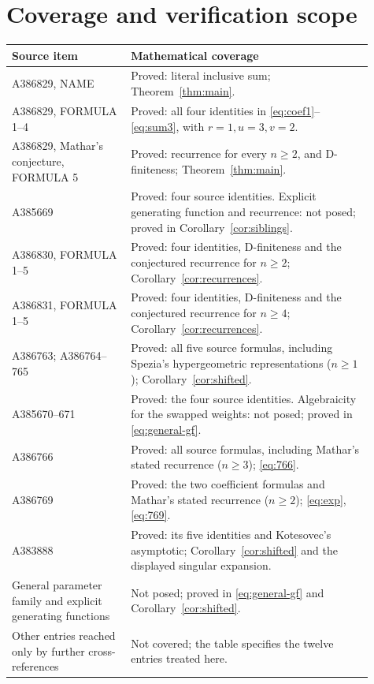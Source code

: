 \documentclass[11pt]{article}
\begin{document}
\section{Coverage and verification scope}
\begin{center}
\small
\begin{tabular}{@{}p{0.30\linewidth}p{0.61\linewidth}@{}}
\toprule
Source item & Mathematical coverage\\
\midrule
A386829, NAME & Proved: literal inclusive sum; Theorem~\ref{thm:main}.\\
A386829, FORMULA 1--4 & Proved: all four identities in
\eqref{eq:coef1}--\eqref{eq:sum3}, with $r=1,u=3,v=2$.\\
A386829, Mathar's conjecture, FORMULA 5 & Proved: recurrence for every $n\geq2$,
and D-finiteness; Theorem~\ref{thm:main}.\\
A385669 & Proved: four source identities. Explicit generating function
and recurrence: not posed; proved in Corollary~\ref{cor:siblings}.\\
A386830, FORMULA 1--5 & Proved: four identities, D-finiteness and the
conjectured recurrence for $n\geq2$; Corollary~\ref{cor:recurrences}.\\
A386831, FORMULA 1--5 & Proved: four identities, D-finiteness and the
conjectured recurrence for $n\geq4$; Corollary~\ref{cor:recurrences}.\\
A386763; A386764--765 & Proved: all five source formulas, including
Spezia's hypergeometric representations ($n\geq1$);
Corollary~\ref{cor:shifted}.\\
A385670--671 & Proved: the four source identities. Algebraicity for
the swapped weights: not posed; proved in \eqref{eq:general-gf}.\\
A386766 & Proved: all source formulas, including Mathar's stated
recurrence ($n\geq3$); \eqref{eq:766}.\\
A386769 & Proved: the two coefficient formulas and Mathar's stated
recurrence ($n\geq2$); \eqref{eq:exp}, \eqref{eq:769}.\\
A383888 & Proved: its five identities and Kotesovec's asymptotic;
Corollary~\ref{cor:shifted} and the displayed singular expansion.\\
General parameter family and explicit generating functions & Not posed;
proved in \eqref{eq:general-gf} and Corollary~\ref{cor:shifted}.\\
Other entries reached only by further cross-references & Not covered;
the table specifies the twelve entries treated here.\\
\bottomrule
\end{tabular}
\end{center}
\end{document}
